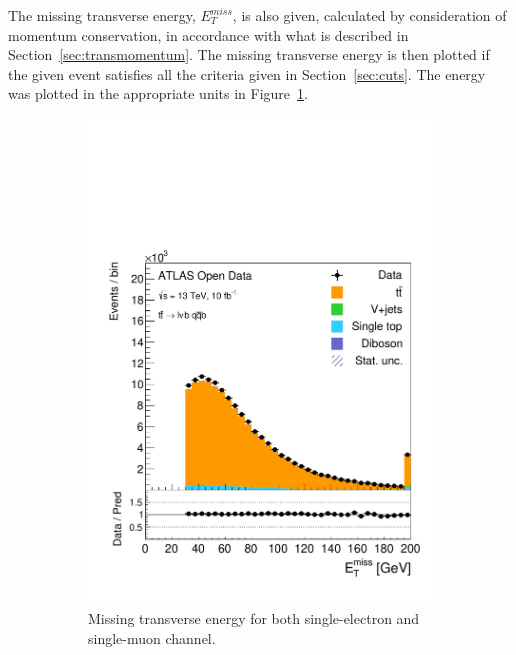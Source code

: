 \documentclass[12pt,a4paper]{article}
\numberwithin{equation}{section}
\begin{document}
The missing transverse energy, $E_T^{miss}$, is also given, calculated by
consideration of momentum conservation, in accordance with what is described in
Section~\ref{sec:transmomentum}. The missing transverse energy is then plotted
if the given event satisfies all the criteria given in Section~\ref{sec:cuts}.
The energy was plotted in the appropriate units in Figure~\ref{fig:etmiss}.\\

\begin{figure}[t!]
    \centering
    \begin{subfigure}[t]{0.47\textwidth}
      \centering
      \includegraphics[width=1.0\textwidth]{figures/hist_etmiss}
      \caption{\label{fig:etmiss}Missing transverse energy for both single-electron and single-muon channel.}
    \end{subfigure}%
      \hfill{}
    \begin{subfigure}[t]{0.47\textwidth}

\end{subfigure}
\end{figure}
\end{document}
